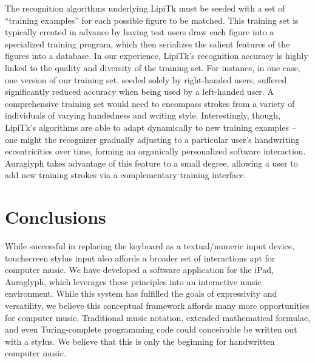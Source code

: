 \documentclass{nime-alternate}
\begin{document}
The recognition algorithms underlying LipiTk must be seeded with a set of ``training examples'' for each possible figure to be matched. 
This training set is typically created in advance by having test users draw each figure into a specialized training program, which then serializes the salient features of the figures into a database. 
In our experience, LipiTk's recognition accuracy is highly linked to the quality and diversity of the training set. 
For instance, in one case, one version of our training set, seeded solely by right-handed users, suffered significantly reduced accuracy when being used by a left-handed user. 
A comprehensive training set would need to encompass strokes from a variety of individuals of varying handedness and writing style. 
Interestingly, though, LipiTk's algorithms are able to adapt dynamically to new training examples -- one might the recognizer gradually adjusting to a particular user's handwriting eccentricities over time, forming an organically personalized software interaction. 
Auraglyph takes advantage of this feature to a small degree, allowing a user to add new training strokes via a complementary training interface. 

\section{Conclusions}
\label{sec:Conclusions}

While successful in replacing the keyboard as a textual/numeric input device, touchscreen stylus input also affords a broader set of interactions apt for computer music. 
We have developed a software application for the iPad, Auraglyph, which leverages these principles into an interactive music environment. 
While this system has fulfilled the goals of expressivity and versatility, we believe this conceptual framework affords many more opportunities for computer music. 
Traditional music notation, extended mathematical formulae, and even Turing-complete programming code could conceivable be written out with a stylus. 
We believe that this is only the beginning for handwritten computer music. 


%

%
%


\end{document}
